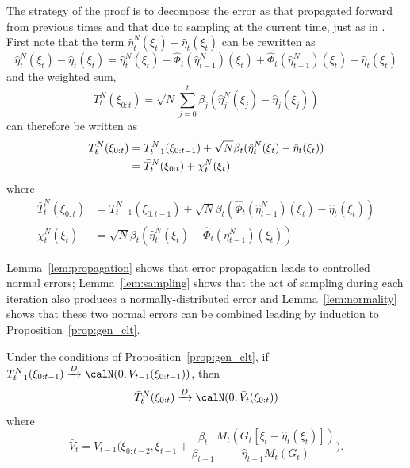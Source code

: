 The strategy of the proof is to decompose the error as that propagated forward
from previous times and that due to sampling at the current time, just as in
\cite{DelMoral:2004ux}. First note that the term
$\hat\eta_t^N(\xi_t)-\hat\eta_t(\xi_t)$ can be rewritten as
\begin{equation}
  \hat\eta_t^N(\xi_t)-\hat\eta_t(\xi_t) =
  \hat\eta_t^N(\xi_t) - \hat\Phi_t(\hat\eta_{t-1}^N)(\xi_t) +
  \hat\Phi_t(\hat\eta_{t-1}^N)(\xi_t) - \hat\eta_t(\xi_t)
\end{equation}
and the weighted sum,
\begin{equation}
  T_t^N(\xi_{0:t}) =\sqrt{N}
  \sum_{j=0}^t\beta_j(\hat\eta_j^N(\xi_j)-\hat\eta_j(\xi_j))
\end{equation}
can therefore be written as
\begin{align}
  T_t^N(\xi_{0:t}) &= T_{t-1}^N(\xi_{0:t-1}) +
  \sqrt{N}\beta_t(\hat\eta_t^N(\xi_t)-\hat\eta_t(\xi_t)) \notag\\
  &= \bar{T}_t^N(\xi_{0:t}) + \chi_t^N(\xi_t)
\end{align}
where
\begin{align}
  \bar{T}_t^N(\xi_{0:t}) &= T_{t-1}^N(\xi_{0:t-1}) +
  \sqrt{N}\beta_t(\hat\Phi_t(\hat\eta_{t-1}^N)(\xi_t) - \hat\eta_t(\xi_t))
  \label{eq:bar_t_t} \\
  \chi_t^N(\xi_t) &=
  \sqrt{N}\beta_t(\hat\eta_t^N(\xi_t) - \hat\Phi_t(\eta_{t-1}^N)(\xi_t))
\end{align}

Lemma~\ref{lem:propagation} shows that error propagation leads to controlled
normal errors; Lemma~\ref{lem:sampling} shows that the act of sampling during
each iteration also produces a normally-distributed error and
Lemma~\ref{lem:normality} shows that these two normal errors can be combined
leading by induction to Proposition~\ref{prop:gen_clt}.

\begin{lemma}\label{lem:propagation}
  Under the conditions of Proposition~\ref{prop:gen_clt}, if
  $T_{t-1}^N(\xi_{0:t-1})\xrightarrow{D}\calN(0,V_{t-1}(\xi_{0:t-1}))$, then
  \begin{equation}
    \bar{T}_t^N(\xi_{0:t})\xrightarrow{D}\calN(0, \bar{V}_t(\xi_{0:t}))
  \end{equation}
  where
  \begin{equation}
    \bar{V}_t = V_{t-1}\biggl(\xi_{0:t-2}, \xi_{t-1} +
    \frac{\beta_t}{\beta_{t-1}}
    \frac{M_t(G_t[\xi_t-\hat\eta_t(\xi_t)])}{\hat\eta_{t-1}M_t(G_t)}\biggr).
  \end{equation}
\end{lemma}

